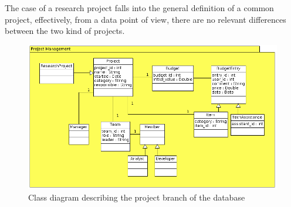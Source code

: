 The case of a research project falls into the general definition of a
common project, effectively, from a data point of view, there are no
relevant differences between the two kind of projects.

\begin{figure}[H]
\centering
\includegraphics[scale=0.50]{assign3/argo/imgs/project.png}
\caption{Class diagram describing the project branch of the database}
\label{3img:classprj}
\end{figure}

